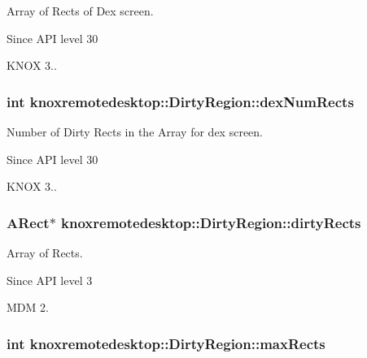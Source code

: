 \-Array of \-Rects of \-Dex screen. 

\begin{DoxySince}{\-Since}
\-A\-P\-I level 30 

\-K\-N\-O\-X 3.. 
\end{DoxySince}
\hypertarget{classknoxremotedesktop_1_1DirtyRegion_a5656ac769cbdd1a65aa215f87f1cab25}{
\subsubsection[{dex\-Num\-Rects}]{\setlength{\rightskip}{0pt plus 5cm}int {\bf knoxremotedesktop\-::\-Dirty\-Region\-::dex\-Num\-Rects}}}\label{classknoxremotedesktop_1_1DirtyRegion_a5656ac769cbdd1a65aa215f87f1cab25}


\-Number of \-Dirty \-Rects in the \-Array for dex screen. 

\begin{DoxySince}{\-Since}
\-A\-P\-I level 30 

\-K\-N\-O\-X 3.. 
\end{DoxySince}
\hypertarget{classknoxremotedesktop_1_1DirtyRegion_a46d58ad2c718f79613f9ad1b02d64c3d}{
\subsubsection[{dirty\-Rects}]{\setlength{\rightskip}{0pt plus 5cm}\-A\-Rect$\ast$ {\bf knoxremotedesktop\-::\-Dirty\-Region\-::dirty\-Rects}}}\label{classknoxremotedesktop_1_1DirtyRegion_a46d58ad2c718f79613f9ad1b02d64c3d}


\-Array of \-Rects. 

\begin{DoxySince}{\-Since}
\-A\-P\-I level 3

\-M\-D\-M 2. 
\end{DoxySince}
\hypertarget{classknoxremotedesktop_1_1DirtyRegion_a65b638db44b5b39191e0d72123d9ccc8}{
\subsubsection[{max\-Rects}]{\setlength{\rightskip}{0pt plus 5cm}int {\bf knoxremotedesktop\-::\-Dirty\-Region\-::max\-Rects}}}\label{classknoxremotedesktop_1_1DirtyRegion_a65b638db44b5b39191e0d72123d9ccc8}


